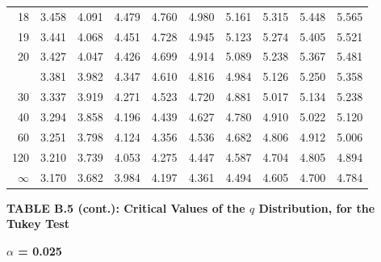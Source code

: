 \documentclass[10pt]{article}
\begin{document}
\begin{longtable}{@{}r!{\vrule width 0.8pt\hspace{0.55em}}rrrrrrrrr@{}}
18 & 3.458 & 4.091 & 4.479 & 4.760 & 4.980 & 5.161 & 5.315 & 5.448 & 5.565 \\
19 & 3.441 & 4.068 & 4.451 & 4.728 & 4.945 & 5.123 & 5.274 & 5.405 & 5.521 \\
20 & 3.427 & 4.047 & 4.426 & 4.699 & 4.914 & 5.089 & 5.238 & 5.367 & 5.481 \\
 & 3.381 & 3.982 & 4.347 & 4.610 & 4.816 & 4.984 & 5.126 & 5.250 & 5.358 \\
30 & 3.337 & 3.919 & 4.271 & 4.523 & 4.720 & 4.881 & 5.017 & 5.134 & 5.238 \\
40 & 3.294 & 3.858 & 4.196 & 4.439 & 4.627 & 4.780 & 4.910 & 5.022 & 5.120 \\
60 & 3.251 & 3.798 & 4.124 & 4.356 & 4.536 & 4.682 & 4.806 & 4.912 & 5.006 \\
120 & 3.210 & 3.739 & 4.053 & 4.275 & 4.447 & 4.587 & 4.704 & 4.805 & 4.894 \\
\addlinespace[0.30em]
$\infty$ & 3.170 & 3.682 & 3.984 & 4.197 & 4.361 & 4.494 & 4.605 & 4.700 & 4.784 \\
\end{longtable}
\newpage
\thispagestyle{empty}
\begin{center}
{\large\bfseries TABLE B.5 (cont.): Critical Values of the $q$ Distribution, for the Tukey Test\par}
\end{center}
{\large\bfseries $\alpha$ = 0.025\par}
\vspace{0.45em}
\small
\end{document}
